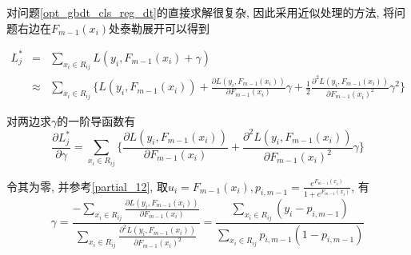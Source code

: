 \begin{remark}
    对问题\ref{opt_gbdt_cls_reg_dt}的直接求解很复杂, 因此采用近似处理的方法, 将问题右边在$F_{m-1}(x_i)$处泰勒展开可以得到

    \begin{equation*}
        \begin{array}{rcl}
            L_j^* & =       & \sum_{x_i\in R_{ij}}L(y_i, F_{m-1}(x_i) + \gamma)                                                                                                                                          \\
                  & \approx & \sum_{x_i\in R_{ij}}\Big\{L(y_i, F_{m-1}(x_i)) + \frac{\partial L(y_i, F_{m-1}(x_i))}{\partial F_{m-1}(x_i)}\gamma + \frac{1}{2}\frac{\partial^2 L(y_i, F_{m-1}(x_i))}{\partial F_{m-1}(x_i)^2}\gamma^2\Big\}
        \end{array}
    \end{equation*}

    对两边求$\gamma$的一阶导函数有
    \begin{equation*}
        \frac{\partial L_j^*}{\partial \gamma} = \sum_{x_i\in R_{ij}} \Big\{\frac{\partial L(y_i, F_{m-1}(x_i))}{\partial F_{m-1}(x_i)} + \frac{\partial^2 L(y_i, F_{m-1}(x_i))}{\partial F_{m-1}(x_i)^2}\gamma\Big\}
    \end{equation*}

    令其为零, 并参考\ref{partial_12}, 取$u_i=F_{m-1}(x_i), p_{i, m-1} = \frac{e^{F_{m-1}(x_i)}}{1 + e^{F_{m-1}(x_i)} }$, 有
    \begin{equation}
        \gamma = \frac{-\sum_{x_i\in R_{ij}}\frac{\partial L(y_i, F_{m-1}(x_i))}{\partial F_{m-1}(x_i)}}{\sum_{x_i\in R_{ij}}\frac{\partial^2 L(y_i, F_{m-1}(x_i))}{\partial F_{m-1}(x_i)^2}} = \frac{\sum_{x_i\in R_{ij}}(y_i-p_{i, m-1})}{\sum_{x_i\in R_{ij}}p_{i, m-1}(1-p_{i, m-1})}
    \end{equation}

\end{remark}
